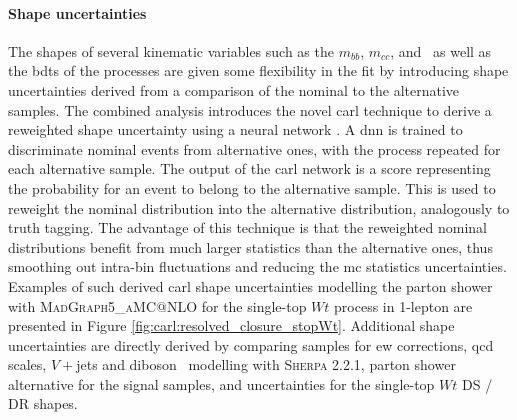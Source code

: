 \paragraph{Shape uncertainties} The shapes of several kinematic variables such as the $m_{bb}$, $m_{cc}$, and \ptv\ as well as the \glspl{bdt} of the processes are given some flexibility in the fit by introducing shape uncertainties derived from a comparison of the nominal to the alternative samples. The combined analysis introduces the novel \gls{carl} technique to derive a reweighted shape uncertainty using a neural network \cite{carl}. A \gls{dnn} is trained to discriminate nominal events from alternative ones, with the process repeated for each alternative sample. The output of the \gls{carl} network is a score representing the probability for an event to belong to the alternative sample. This is used to reweight the nominal distribution into the alternative distribution, analogously to truth tagging. The advantage of this technique is that the reweighted nominal distributions benefit from much larger statistics than the alternative ones, thus smoothing out intra-bin fluctuations and reducing the \gls{mc} statistics uncertainties. Examples of such derived \gls{carl} shape uncertainties modelling the parton shower with \textsc{MadGraph5\_aMC@NLO} for the single-top $Wt$ process in 1-lepton are presented in Figure \ref{fig:carl:resolved_closure_stopWt}. Additional shape uncertainties are directly derived by comparing samples for \gls{ew} corrections, \gls{qcd} scales, $V+$jets and diboson \ptv\ modelling with \textsc{Sherpa} 2.2.1, parton shower alternative for the signal samples, and uncertainties for the single-top $Wt$ DS / DR shapes.\\

